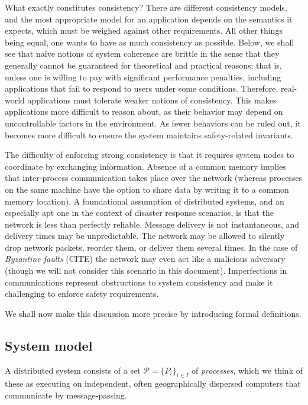 \documentclass[]             %
{NASA}                       %
\theoremstyle{definition}
\begin{document}
What exactly constitutes consistency? There are different consistency
models, and the most appropriate model for an application depends on the
semantics it expects, which must be weighed against other requirements.
All other things being equal, one wants to have as much consistency as
possible. Below, we shall see that \textrm{na\"ive} notions of system
coherence are brittle in the sense that they generally cannot be
guaranteed for theoretical and practical reasons; that is, unless one is
willing to pay with significant performance penalties, including
applications that fail to respond to users under some conditions.
Therefore, real-world applications must tolerate weaker notions of
consistency. This makes applications more difficult to reason about, as
their behavior may depend on uncontrollable factors in the environment.
As fewer behaviors can be ruled out, it becomes more difficult to ensure
the system maintains safety-related invariants.

The difficulty of enforcing strong consistency is that it requires
system nodes to coordinate by exchanging information. Absence of a
common memory implies that inter-process communication takes place over
the network (whereas processes on the same machine have the option to
share data by writing it to a common memory location). A foundational
assumption of distributed systems, and an especially apt one in the
context of disaster response scenarios, is that the network is less than
perfectly reliable. Message delivery is not instantaneous, and delivery
times may be unpredictable. The network may be allowed to silently drop
network packets, reorder them, or deliver them several times. In the
case of \emph{Byzantine faults} (CITE) the network may even act like a
malicious adversary (though we will not consider this scenario in this
document). Imperfections in communications represent obstructions to
system consistency and make it challenging to enforce safety
requirements.

We shall now make this discussion more precise by introducing formal
definitions.

\hypertarget{system-model}{%
\subsection{System model}\label{system-model}}

A distributed system consists of a set
\(\mathcal{P} = \{P_i\}_{i\in I}\) of \emph{processes}, which we think
of these as executing on independent, often geographically dispersed
computers that communicate by message-passing.
\end{document}
